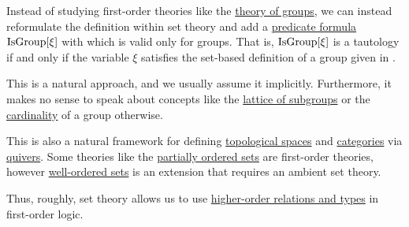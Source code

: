 \begin{remark}\label{rem:first_order_theories_in_zfc}
  Instead of studying first-order theories like the \hyperref[def:group/theory]{theory of groups}, we can instead reformulate the definition within set theory and add a \hyperref[rem:predicate_formula]{predicate formula} \( \operatorname{IsGroup}[\xi] \) with which is valid only for groups. That is, \( \operatorname{IsGroup}[\xi] \) is a tautology if and only if the variable \( \xi \) satisfies the set-based definition of a group given in .

  This is a natural approach, and we usually assume it implicitly. Furthermore, it makes no sense to speak about concepts like the \hyperref[thm:substructures_form_complete_lattice]{lattice of subgroups} or the \hyperref[def:cardinal]{cardinality} of a group otherwise.

  This is also a natural framework for defining \hyperref[def:topological_space]{topological spaces} and \hyperref[def:category]{categories} via \hyperref[def:quiver]{quivers}. Some theories like the \hyperref[def:partially_ordered_set]{partially ordered sets} are first-order theories, however \hyperref[def:well_ordered_set]{well-ordered sets} is an extension that requires an ambient set theory.

  Thus, roughly, set theory allows us to use \hyperref[rem:higher_order_logic]{higher-order relations and types} in first-order logic.
\end{remark}
